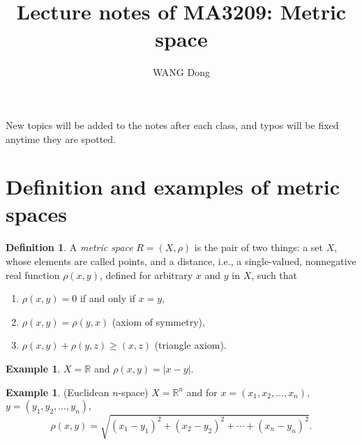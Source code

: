 \documentclass[a4paper,12pt]{article}
\title{Lecture notes of MA3209: Metric space}
\author{WANG Dong}
\newcommand{\ie}{i.e.}
\newcommand{\realR}{\mathbb{R}}
\theoremstyle{definition}
\newtheorem{defn}[thm]{Definition}
\newtheorem{expl}[thm]{Example}
\theoremstyle{remark}
\begin{document}
\maketitle

New topics will be added to the notes after each class, and typos will be fixed anytime they are spotted.

\section{Definition and examples of metric spaces}

\begin{defn}
  A \emph{metric space} $R = (X, \rho)$ is the pair of two things: a set $X$, whose elements are called points, and a distance, \ie, a single-valued, nonnegative real function $\rho(x,y)$, defined for arbitrary $x$ and $y$ in $X$, such that
  \begin{enumerate}
  \item \label{enu:metric_1}
    $\rho(x,y) = 0$ if and only if $x = y$,
  \item \label{enu:metric_2}
    $\rho(x,y) = \rho(y,x)$ (axiom of symmetry),
  \item \label{enu:metric_3}
    $\rho(x,y) + \rho(y,z) \geq (x,z)$ (triangle axiom).
  \end{enumerate}
\end{defn}

\begin{expl}
  $X = \realR$ and $\rho(x,y) = \lvert x-y \rvert$.
\end{expl}

\begin{expl} \label{expl:Euclidean}
  (Euclidean $n$-space) $X = \realR^n$ and for $x = (x_1, x_2, \dotsc, x_n)$, $y = (y_1, y_2, \dotsc, y_n)$,
  \begin{equation*}
  \rho(x, y) = \sqrt{(x_1 - y_1)^2 + (x_2 - y_2)^2 + \dotsb + (x_n - y_n)^2}.
  \end{equation*}
\end{expl}
\end{document}

